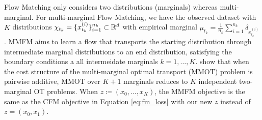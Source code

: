 Flow Matching only considers two distributions (marginals) whereas multi-marginal. For multi-marginal Flow Matching, we have the observed dataset with $K$ distributions $\chi_{t_k}=\{x_{t_k}^{(i)}\}_{i=1}^{n_k}\subset \Bbb R^d$ with empirical marginal $\mu_{t_k}=\frac{1}{n_k}\sum_{i=1}^{n_k}\delta_{x_{t_k}^{(i)}}$. MMFM aims to learn a flow that transports the starting distribution through intermediate marginal distributions to an end distribution, satisfying the boundary conditions a all intermeidate marginals $k=1,\dots,K$. \citet{rohbeckMODELINGCOMPLEXSYSTEM2025} show that when the cost structure of the multi-marginal optimal transport (MMOT) problem is pairwise additive, MMOT over $K+1$ marginals reduces to $K$ independent two-marginal OT problems. When $z\coloneqq (x_0,\dots,x_K)$, the MMFM objective is the same as the CFM objective in Equation \ref{eq:fm_loss} with our new $z$ instead of $z=(x_0,x_1)$.



